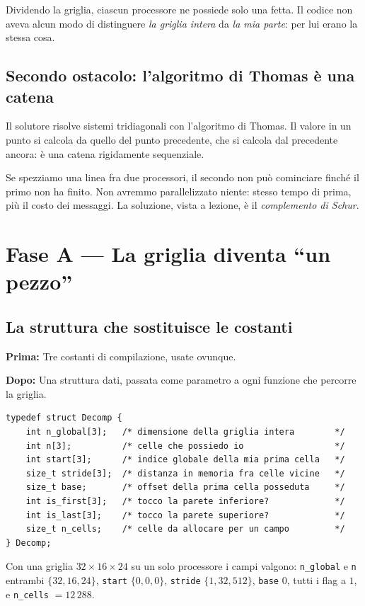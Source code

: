 \documentclass[11pt,a4paper]{article}
\newcommand{\prima}[1]{\par\smallskip\noindent\textbf{\color{scuro}Prima:} #1\par}
\newcommand{\dopo}[1]{\par\smallskip\noindent\textbf{\color{scuro}Dopo:} #1\par\smallskip}
\newcommand{\cd}[1]{\texttt{\small #1}}
\begin{document}
Dividendo la griglia, ciascun processore ne possiede solo una fetta. Il codice
non aveva alcun modo di distinguere \emph{la griglia intera} da \emph{la mia
parte}: per lui erano la stessa cosa.

\subsection*{Secondo ostacolo: l'algoritmo di Thomas è una catena}

Il solutore risolve sistemi tridiagonali con l'algoritmo di Thomas. Il valore in
un punto si calcola da quello del punto precedente, che si calcola dal
precedente ancora: è una catena rigidamente sequenziale.

Se spezziamo una linea fra due processori, il secondo non può cominciare finché
il primo non ha finito. Non avremmo parallelizzato niente: stesso tempo di
prima, più il costo dei messaggi. La soluzione, vista a lezione, è il
\emph{complemento di Schur}.

\section{Fase A --- La griglia diventa ``un pezzo''}

\subsection*{La struttura che sostituisce le costanti}

\prima{Tre costanti di compilazione, usate ovunque.}
\dopo{Una struttura dati, passata come parametro a ogni funzione che percorre
la griglia.}

\begin{lstlisting}
typedef struct Decomp {
    int n_global[3];   /* dimensione della griglia intera        */
    int n[3];          /* celle che possiedo io                  */
    int start[3];      /* indice globale della mia prima cella   */
    size_t stride[3];  /* distanza in memoria fra celle vicine   */
    size_t base;       /* offset della prima cella posseduta     */
    int is_first[3];   /* tocco la parete inferiore?             */
    int is_last[3];    /* tocco la parete superiore?             */
    size_t n_cells;    /* celle da allocare per un campo         */
} Decomp;
\end{lstlisting}

Con una griglia $32\times16\times24$ su un solo processore i campi valgono:
\cd{n\_global} e \cd{n} entrambi $\{32,16,24\}$, \cd{start} $\{0,0,0\}$,
\cd{stride} $\{1,32,512\}$, \cd{base} $0$, tutti i flag a $1$, e
\cd{n\_cells} $=12\,288$.
\end{document}
